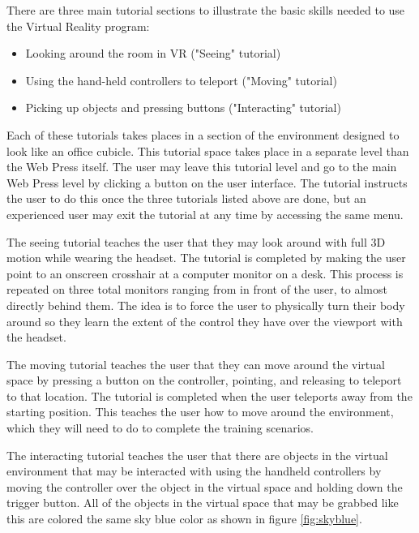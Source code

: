 \documentclass[onecolumn, draftclsnofoot,10pt, compsoc]{IEEEtran}
\newcounter{subsubsubsection}[subsubsection]
\begin{document}
There are three main tutorial sections to illustrate the basic skills needed to use the Virtual Reality program:

\begin{itemize}
    \item Looking around the room in VR ("Seeing" tutorial)
    \item Using the hand-held controllers to teleport ("Moving" tutorial)
    \item Picking up objects and pressing buttons ("Interacting" tutorial)
\end{itemize}

Each of these tutorials takes places in a section of the environment designed to look like an office cubicle. This tutorial space takes place in a separate level than the Web Press itself. The user may leave this tutorial level and go to the main Web Press level by clicking a button on the user interface. The tutorial instructs the user to do this once the three tutorials listed above are done, but an experienced user may exit the tutorial at any time by accessing the same menu.

The seeing tutorial teaches the user that they may look around with full 3D motion while wearing the headset. The tutorial is completed by making the user point to an onscreen crosshair at a computer monitor on a desk. This process is repeated on three total monitors ranging from in front of the user, to almost directly behind them. The idea is to force the user to physically turn their body around so they learn the extent of the control they have over the viewport with the headset.

The moving tutorial teaches the user that they can move around the virtual space by pressing a button on the controller, pointing, and releasing to teleport to that location. The tutorial is completed when the user teleports away from the starting position. This teaches the user how to move around the environment, which they will need to do to complete the training scenarios.   

The interacting tutorial teaches the user that there are objects in the virtual environment that may be interacted with using the handheld controllers by moving the controller over the object in the virtual space and holding down the trigger button. All of the objects in the virtual space that may be grabbed like this are colored the same sky blue color as shown in figure \ref{fig:skyblue}.
\end{document}
